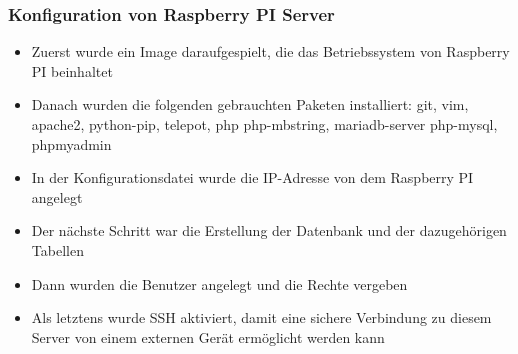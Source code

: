 \subsubsection{Konfiguration von Raspberry PI Server}
\begin{itemize}
	\item Zuerst wurde ein Image daraufgespielt, die das Betriebssystem von Raspberry PI beinhaltet
\end{itemize}
\begin{itemize}
	\item Danach wurden die folgenden gebrauchten Paketen installiert: git, vim, apache2, python-pip, telepot, php php-mbstring, mariadb-server php-mysql, phpmyadmin
\end{itemize}
\begin{itemize}
	\item In der Konfigurationsdatei wurde die IP-Adresse von dem Raspberry PI angelegt
\end{itemize}
\begin{itemize}
	\item Der nächste Schritt war die Erstellung der Datenbank und der dazugehörigen Tabellen
\end{itemize}
\begin{itemize}
	\item Dann wurden die Benutzer angelegt und die Rechte vergeben
\end{itemize}
\begin{itemize}
	\item Als letztens wurde SSH aktiviert, damit eine sichere Verbindung zu diesem Server von einem externen Gerät ermöglicht werden kann
\end{itemize}
